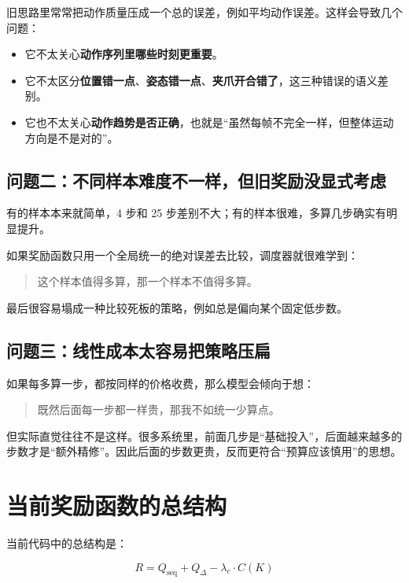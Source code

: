 \documentclass[12pt]{ctexart}
\begin{document}
旧思路里常常把动作质量压成一个总的误差，例如平均动作误差。这样会导致几个问题：

\begin{itemize}
    \item 它不太关心\textbf{动作序列里哪些时刻更重要}。
    \item 它不太区分\textbf{位置错一点}、\textbf{姿态错一点}、\textbf{夹爪开合错了}，这三种错误的语义差别。
    \item 它也不太关心\textbf{动作趋势是否正确}，也就是“虽然每帧不完全一样，但整体运动方向是不是对的”。
\end{itemize}

\subsection{问题二：不同样本难度不一样，但旧奖励没显式考虑}

有的样本本来就简单，4 步和 25 步差别不大；有的样本很难，多算几步确实有明显提升。

如果奖励函数只用一个全局统一的绝对误差去比较，调度器就很难学到：

\begin{quote}
    这个样本值得多算，那一个样本不值得多算。
\end{quote}

最后很容易塌成一种比较死板的策略，例如总是偏向某个固定低步数。

\subsection{问题三：线性成本太容易把策略压扁}

如果每多算一步，都按同样的价格收费，那么模型会倾向于想：

\begin{quote}
    既然后面每一步都一样贵，那我不如统一少算点。
\end{quote}

但实际直觉往往不是这样。很多系统里，前面几步是“基础投入”，后面越来越多的步数才是“额外精修”。因此后面的步数更贵，反而更符合“预算应该慎用”的思想。

\section{当前奖励函数的总结构}

当前代码中的总结构是：

\begin{equation}
    R = Q_{\text{seq}} + Q_{\Delta} - \lambda_c \cdot C(K)
\end{equation}
\end{document}
